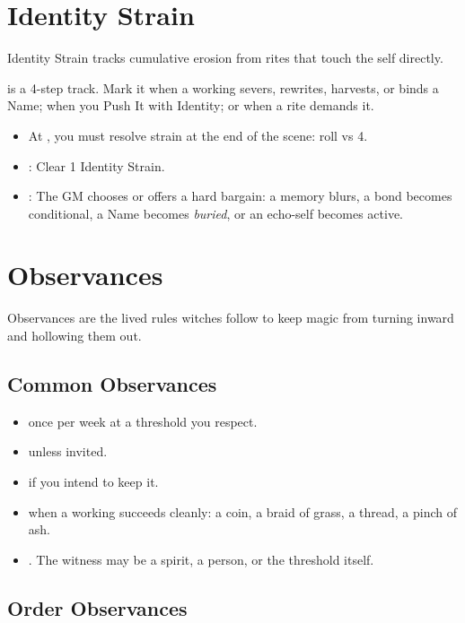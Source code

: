 \section{Identity Strain}
Identity Strain tracks cumulative erosion from rites that touch the self directly.

\begin{RuleBox}
 is a 4-step track. Mark it when a working severs, rewrites, harvests, or binds a Name; when you Push It with Identity; or when a rite demands it.
\end{RuleBox}

\begin{itemize}
  \item At , you must resolve strain at the end of the scene: roll  vs \DV{} 4.
  \item {}: Clear 1 Identity Strain.
  \item {}: The GM chooses or offers a hard bargain: a memory blurs, a bond becomes conditional, a Name becomes \emph{buried}, or an echo-self becomes active.
\end{itemize}

\section{Observances}
Observances are the lived rules witches follow to keep magic from turning inward and hollowing them out.

\subsection{Common Observances}
\begin{itemize}
  \item {} once per week at a threshold you respect.
  \item {} unless invited.
  \item {} if you intend to keep it.
  \item {} when a working succeeds cleanly: a coin, a braid of grass, a thread, a pinch of ash.
  \item {}. The witness may be a spirit, a person, or the threshold itself.
\end{itemize}

\subsection{Order Observances}
